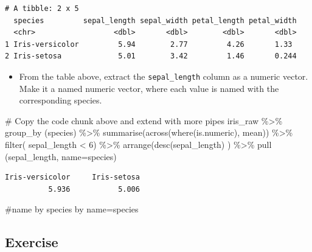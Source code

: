 \documentclass[
  letterpaper,
  DIV=11,
  numbers=noendperiod]{scrartcl}
\newenvironment{Shaded}{\begin{snugshade}}{\end{snugshade}}
\newcommand{\AttributeTok}[1]{\textcolor[rgb]{0.40,0.45,0.13}{#1}}
\newcommand{\CommentTok}[1]{\textcolor[rgb]{0.37,0.37,0.37}{#1}}
\newcommand{\DecValTok}[1]{\textcolor[rgb]{0.68,0.00,0.00}{#1}}
\newcommand{\FunctionTok}[1]{\textcolor[rgb]{0.28,0.35,0.67}{#1}}
\newcommand{\NormalTok}[1]{\textcolor[rgb]{0.00,0.23,0.31}{#1}}
\newcommand{\SpecialCharTok}[1]{\textcolor[rgb]{0.37,0.37,0.37}{#1}}
\providecommand{\tightlist}{%
  \setlength{\itemsep}{0pt}\setlength{\parskip}{0pt}}\usepackage{longtable,booktabs,array}
\begin{document}
\begin{verbatim}
# A tibble: 2 x 5
  species         sepal_length sepal_width petal_length petal_width
  <chr>                  <dbl>       <dbl>        <dbl>       <dbl>
1 Iris-versicolor         5.94        2.77         4.26       1.33 
2 Iris-setosa             5.01        3.42         1.46       0.244
\end{verbatim}

\begin{itemize}
\tightlist
\item
  From the table above, extract the \texttt{sepal\_length} column as a
  numeric vector. Make it a named numeric vector, where each value is
  named with the corresponding species.
\end{itemize}

\begin{Shaded}
\begin{Highlighting}[]
\CommentTok{\# Copy the code chunk above and extend with more pipes}
\NormalTok{iris\_raw }\SpecialCharTok{\%\textgreater{}\%} 
  \FunctionTok{group\_by}\NormalTok{ (species) }\SpecialCharTok{\%\textgreater{}\%} 
  \FunctionTok{summarise}\NormalTok{(}\FunctionTok{across}\NormalTok{(}\FunctionTok{where}\NormalTok{(is.numeric), mean)) }\SpecialCharTok{\%\textgreater{}\%} 
  \FunctionTok{filter}\NormalTok{( sepal\_length }\SpecialCharTok{\textless{}} \DecValTok{6}\NormalTok{) }\SpecialCharTok{\%\textgreater{}\%} 
  \FunctionTok{arrange}\NormalTok{(}\FunctionTok{desc}\NormalTok{(sepal\_length) ) }\SpecialCharTok{\%\textgreater{}\%} 
  \FunctionTok{pull}\NormalTok{ (sepal\_length, }\AttributeTok{name=}\NormalTok{species)}
\end{Highlighting}
\end{Shaded}

\begin{verbatim}
Iris-versicolor     Iris-setosa 
          5.936           5.006 
\end{verbatim}

\begin{Shaded}
\begin{Highlighting}[]
\CommentTok{\#name by species by name=species}
\end{Highlighting}
\end{Shaded}

\subsection{Exercise}\label{exercise-3}
\end{document}
